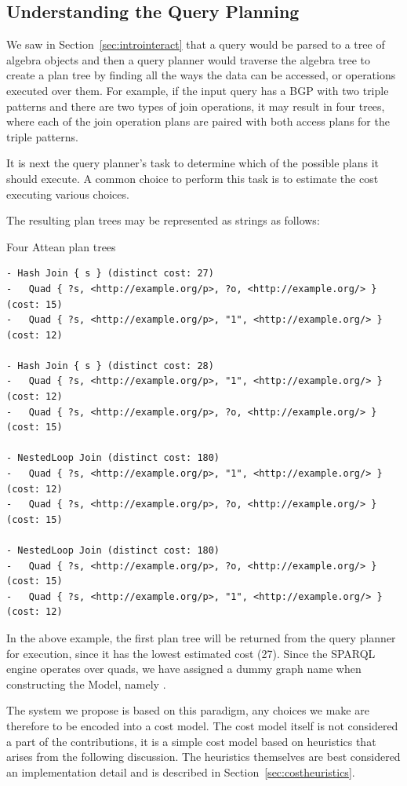 \subsection{Understanding the Query Planning}\label{sec:understandquery}

We saw in Section~\ref{sec:introinteract} that a query would be parsed
to a tree of algebra objects and then a query planner would traverse
the algebra tree to create a plan tree by finding all the ways the
data can be accessed, or operations executed over them. For example,
if the input query has a BGP with two triple patterns and there are
two types of join operations, it may result in four trees, where each
of the join operation plans are paired with both access plans for the
triple patterns.

It is next the query planner's task to determine which of the possible
plans it should execute. A common choice to perform this task is to
estimate the cost executing various choices.

The resulting plan trees may be represented as strings as follows:
\begin{example}{Four Attean plan trees}
\begin{verbatim}
- Hash Join { s } (distinct cost: 27)
-   Quad { ?s, <http://example.org/p>, ?o, <http://example.org/> } (cost: 15)
-   Quad { ?s, <http://example.org/p>, "1", <http://example.org/> } (cost: 12)

- Hash Join { s } (distinct cost: 28)
-   Quad { ?s, <http://example.org/p>, "1", <http://example.org/> } (cost: 12)
-   Quad { ?s, <http://example.org/p>, ?o, <http://example.org/> } (cost: 15)

- NestedLoop Join (distinct cost: 180)
-   Quad { ?s, <http://example.org/p>, "1", <http://example.org/> } (cost: 12)
-   Quad { ?s, <http://example.org/p>, ?o, <http://example.org/> } (cost: 15)

- NestedLoop Join (distinct cost: 180)
-   Quad { ?s, <http://example.org/p>, ?o, <http://example.org/> } (cost: 15)
-   Quad { ?s, <http://example.org/p>, "1", <http://example.org/> } (cost: 12)
\end{verbatim}
\end{example}
In the above example, the first plan tree will be returned from the
query planner for execution, since it has the lowest estimated cost
(27). Since the SPARQL engine operates over quads, we have assigned a
dummy graph name when constructing the Model, namely
. 


The system we propose is based on this paradigm, any choices we make
are therefore to be encoded into a cost model. The cost model itself
is not considered a part of the contributions, it is a simple cost
model based on heuristics that arises from the following
discussion. The heuristics themselves are best considered an
implementation detail and is described in
Section~\ref{sec:costheuristics}.

